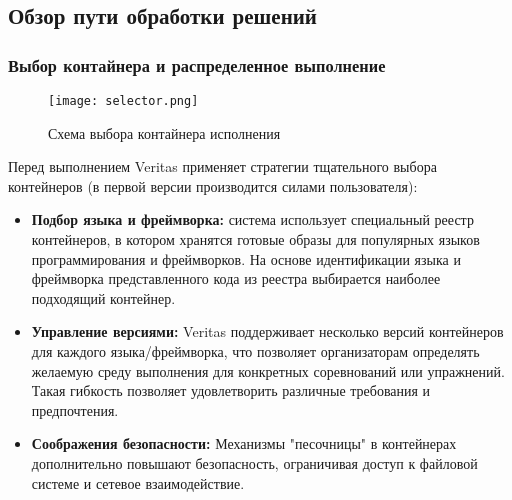 

\subsection{Обзор пути обработки решений}


\subsubsection{Выбор контайнера и распределенное выполнение}
\begin{figure}[h]
    \centering
    \texttt{[image: selector.png]}
    \caption{Схема выбора контайнера исполнения}
    \noindent
\end{figure}

\noindent

Перед выполнением Veritas применяет стратегии тщательного выбора контейнеров (в первой версии производится силами пользователя):
\begin{itemize}
    \itemsep 0em
    \item \textbf{Подбор языка и фреймворка:} система использует специальный реестр контейнеров, в котором хранятся готовые образы для популярных языков программирования и фреймворков. На основе идентификации языка и фреймворка представленного кода из реестра выбирается наиболее подходящий контейнер.
    \item \textbf{Управление версиями:} Veritas поддерживает несколько версий контейнеров для каждого языка/фреймворка, что позволяет организаторам определять желаемую среду выполнения для конкретных соревнований или упражнений. Такая гибкость позволяет удовлетворить различные требования и предпочтения.
    \item \textbf{Соображения безопасности:} Механизмы "песочницы" в контейнерах дополнительно повышают безопасность, ограничивая доступ к файловой системе и сетевое взаимодействие.
\end{itemize}

